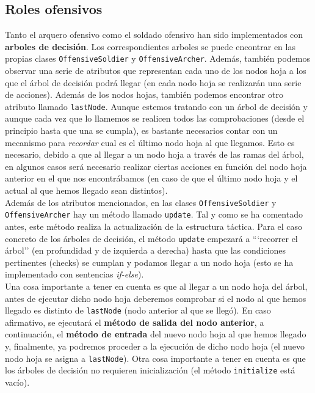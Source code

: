 \medskip
\subsection{Roles ofensivos}
Tanto el arquero ofensivo como el soldado ofensivo han sido implementados con \textbf{arboles de decisión}. Los correspondientes arboles se puede encontrar en las propias clases \texttt{OffensiveSoldier} y \texttt{OffensiveArcher}. Además, también podemos observar una serie de atributos que representan cada uno de los nodos hoja a los que el árbol de decisión podrá llegar (en cada nodo hoja se realizarán una serie de acciones). Además de los nodos hojas, también podemos encontrar otro atributo llamado \texttt{lastNode}. Aunque estemos tratando con un árbol de decisión y aunque cada vez que lo llamemos se realicen todos las comprobaciones (desde el principio hasta que una se cumpla), es bastante necesarios contar con un mecanismo para \textit{recordar} cual es el último nodo hoja al que llegamos. Esto es necesario, debido a que al llegar a un nodo hoja a través de las ramas del árbol, en algunos casos será necesario realizar ciertas acciones en función del nodo hoja anterior en el que nos encontrábamos (en caso de que el último nodo hoja y el actual al que hemos llegado sean distintos). \\

Además de los atributos mencionados, en las clases \texttt{OffensiveSoldier} y \texttt{OffensiveArcher} hay un método llamado \texttt{update}. Tal y como se ha comentado antes, este método realiza la actualización de la estructura táctica. Para el caso concreto de los árboles de decisión, el método \texttt{update} empezará a ```recorrer el árbol'' (en profundidad y de izquierda a derecha) hasta que las condiciones pertinentes (checks) se cumplan y podamos llegar a un nodo hoja (esto se ha implementado con sentencias \textit{if-else}). \\

Una cosa importante a tener en cuenta es que al llegar a un nodo hoja del árbol, antes de ejecutar dicho nodo hoja deberemos comprobar si el nodo al que hemos llegado es distinto de \texttt{lastNode} (nodo anterior al que se llegó). En caso afirmativo, se ejecutará el \textbf{método de salida del nodo anterior}, a continuación, el \textbf{método de entrada} del nuevo nodo hoja al que hemos llegado y, finalmente, ya podremos proceder a la ejecución de dicho nodo hoja (el nuevo nodo hoja se asigna a \texttt{lastNode}). Otra cosa importante a tener en cuenta es que los árboles de decisión no requieren inicialización (el método \texttt{initialize} está vacío). \\

